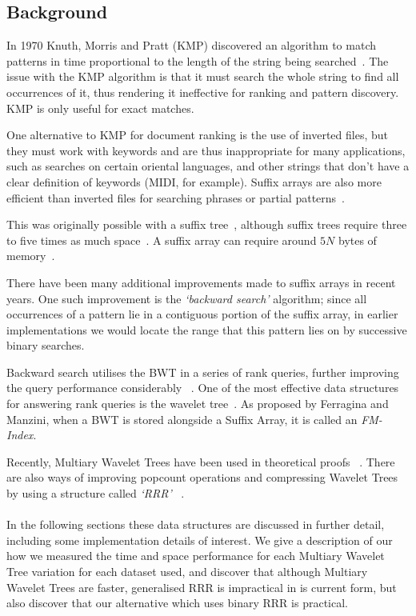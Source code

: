 \subsection{Background}
In 1970 Knuth, Morris and Pratt (KMP) discovered an algorithm to match patterns 
in time proportional to the length of the string being searched~\cite{KMP77, 
McCreight76}. The
issue with the KMP algorithm is that it must search the whole string to find all
occurrences of it, thus rendering it ineffective for ranking and pattern
discovery. KMP is only useful for exact matches.

One alternative to KMP for document ranking is the use of inverted files, but
they must work with keywords and are thus inappropriate for many applications,
such as searches on certain oriental languages, and other strings that don't
have a clear definition of keywords (MIDI, for example). Suffix arrays are also 
more efficient than inverted files for searching phrases or partial 
patterns~\cite{MN10}.

This was originally
possible with a suffix tree~\cite{McCreight76}, although suffix trees require
three to five times as much space~\cite{manber1990}. A suffix array can require
around $5N$ bytes of memory~\cite{manber1990}.

There have been many additional improvements made to suffix arrays
in recent years. One such improvement is the \emph{`backward search'} 
algorithm;
since all occurrences of a pattern lie in a contiguous portion of the suffix
array, in earlier implementations we would locate the range that this pattern
lies on by successive binary searches. 

Backward search utilises the BWT in a series of rank queries, further
improving the query performance considerably ~\cite{CN08, FGM09, FMMN07, GMR06,
MN07:rankselect, MN07:selfindex, MN10, MN06}. One of the most effective data
structures for answering rank queries is the wavelet tree~\cite{CN08, FGM09,
FMMN07, GGV03, MN07:selfindex}. As proposed by Ferragina and Manzini, when a BWT 
is stored alongside a Suffix Array, it is called an 
\emph{FM-Index}\cite{fmindex:ferragina2000}.

Recently, Multiary Wavelet Trees have been used in theoretical proofs
~\cite{FMMN07, yu2009}. There are also ways of improving popcount operations and
compressing Wavelet Trees by using a structure called \emph{`RRR'}
~\cite{rrr2007}.
\\ \\
In the following sections these data structures are discussed in further detail,
including some implementation details of interest. We give a description of our
how we measured the time and space performance for each Multiary Wavelet Tree 
variation for each dataset used, and discover that although Multiary Wavelet 
Trees are faster, generalised RRR is impractical in is current form, but also 
discover that our alternative which uses binary RRR is practical.
